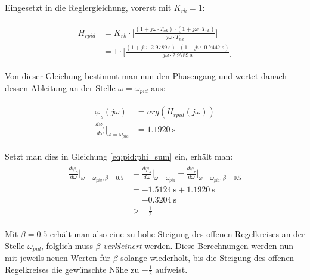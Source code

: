 Eingesetzt in die Reglergleichung, vorerst mit $K_{rk} = 1$:

\begin{gather} \label{eq:pid:t_nk_t_vk_initial_results}
    \begin{split}
        H_{rpid} & = K_{rk} \cdot \biggl[ \frac{(1 + j\omega \cdot T_{nk}) \cdot (1 + j\omega \cdot T_{vk}) }{ j\omega \cdot T_{nk} } \biggr] \\
                 & = 1      \cdot \biggl[ \frac{(1 + j\omega \cdot \SI{2.9789}{\second}) \cdot (1 + j\omega \cdot \SI{0.7447}{\second}) }{ j\omega \cdot  \SI{2.9789}{\second}} \biggr]
    \end{split}
\end{gather}

Von dieser Gleichung bestimmt man nun den Phasengang und wertet danach dessen
Ableitung an der Stelle $\omega = \omega_{pid}$ aus:

\begin{gather} \label{eq:pid:phi_r_first_iteration}
    \begin{split}
        \varphi_s (j\omega)                                            & = arg(H_{rpid}(j\omega))        \\
        \frac{d\varphi_s}{d\omega} \biggr \rvert_{\omega=\omega_{pid}} & = \SI{1.1920}{\second}
    \end{split}
\end{gather}


Setzt man dies in Gleichung \ref{eq:pid:phi_sum} ein, erh\"alt man:
\begin{gather} \label{eq:pid:phi_sum_result_iteration_one}
    \begin{split}
    \frac{d\varphi_o}{d\omega}       \biggr \rvert_{\omega=\omega_{pid}, \beta=0.5}
        & = \frac{d\varphi_s}{d\omega} \biggr \rvert_{\omega=\omega_{pid}}
        + \frac{d\varphi_r}{d\omega} \biggr \rvert_{\omega=\omega_{pid}, \beta=0.5} \\
        & = \SI{-1.5124}{\second} + \SI{1.1920}{\second} \\
        & = \SI{-0.3204}{\second} \\
        & > -\frac{1}{2}
    \end{split}
\end{gather}

Mit  $\beta  = 0.5$  erh\"alt  man  also eine  zu  hohe  Steigung des  offenen
Regelkreises   an    der   Stelle  $\omega_{pid}$,   folglich   muss   $\beta$
{\em{verkleinert}} werden.   Diese Berechnungen  werden nun mit  jeweils neuen
Werten  f\"ur  $\beta$  solange  wiederholt,  bis  die  Steigung  des  offenen
Regelkreises die gew\"unschte N\"ahe zu $-\frac{1}{2}$ aufweist.

